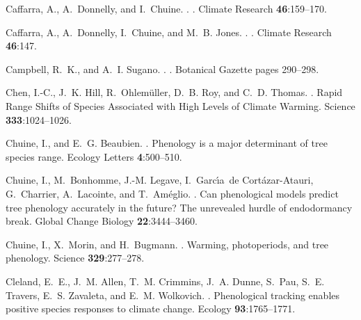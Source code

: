 \documentclass{article}
\begin{document}
\begin{thebibliography}{131}
Caffarra, A., A.~Donnelly, and I.~Chuine.
.
.
\newblock Climate Research {\bf 46}:159--170.

Caffarra, A., A.~Donnelly, I.~Chuine, and M.~B. Jones.
.
.
\newblock Climate Research {\bf 46}:147.

Campbell, R.~K., and A.~I. Sugano.
.
.
\newblock Botanical Gazette pages 290--298.

Chen, I.-C., J.~K. Hill, R.~Ohlem{\"u}ller, D.~B. Roy, and C.~D. Thomas.
.
\newblock Rapid Range Shifts of Species Associated with High Levels of Climate
  Warming.
\newblock Science {\bf 333}:1024--1026.

Chuine, I., and E.~G. Beaubien.
.
\newblock Phenology is a major determinant of tree species range.
\newblock Ecology Letters {\bf 4}:500--510.

Chuine, I., M.~Bonhomme, J.-M. Legave, I.~Garc{\'\i}a~de Cort{\'a}zar-Atauri,
  G.~Charrier, A.~Lacointe, and T.~Am{\'e}glio.
.
\newblock Can phenological models predict tree phenology accurately in the
  future? {T}he unrevealed hurdle of endodormancy break.
\newblock Global Change Biology {\bf 22}:3444--3460.

Chuine, I., X.~Morin, and H.~Bugmann.
.
\newblock Warming, photoperiods, and tree phenology.
\newblock Science {\bf 329}:277--278.

Cleland, E.~E., J.~M. Allen, T.~M. Crimmins, J.~A. Dunne, S.~Pau, S.~E.
  Travers, E.~S. Zavaleta, and E.~M. Wolkovich.
.
\newblock Phenological tracking enables positive species responses to climate
  change.
\newblock Ecology {\bf 93}:1765--1771.


\end{thebibliography}
\end{document}
